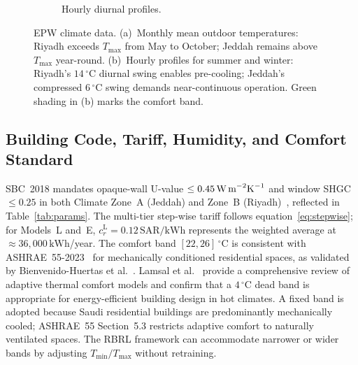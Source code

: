 \documentclass[3p,number]{elsarticle}
\let\oldsubsection\subsection
\renewcommand{\subsection}{\FloatBarrier\oldsubsection}
\newcommand{\Tmin}{T_{\min}}
\newcommand{\Tmax}{T_{\max}}
\newcommand{\SAR}{\text{SAR}}
\newcommand{\kWh}{\text{kWh}}
\begin{document}
\begin{figure}[!t]
\begin{subfigure}[b]{\columnwidth}
\caption{Hourly diurnal profiles.}
\end{subfigure}
\caption{EPW climate data. (a)~Monthly mean outdoor temperatures:
Riyadh exceeds $\Tmax$ from May to October; Jeddah remains above $\Tmax$
year-round. (b)~Hourly profiles for summer and winter: Riyadh's
$14\,^\circ$C diurnal swing enables pre-cooling; Jeddah's compressed
$6\,^\circ$C swing demands near-continuous operation. Green shading in
(b) marks the comfort band.}
\label{fig:climate}
\end{figure}
 
\subsection{Building Code, Tariff, Humidity, and Comfort Standard}
\label{subsec:sbc}
 
SBC~2018 mandates opaque-wall U-value $\le0.45\,\text{W\,m}^{-2}\text{K}^{-1}$ and window SHGC $\le0.25$ in both Climate Zone~A (Jeddah) and Zone~B (Riyadh)~\cite{Alayed2021}, reflected in Table~\ref{tab:params}.
The multi-tier step-wise tariff follows equation~\eqref{eq:stepwise}; for Models~L and~E, $c_r^{\mathrm{L}}=0.12\,\SAR/\kWh$ represents the weighted average at $\approx36{,}000\,\kWh$/year.
The comfort band $[22,26]\,^\circ$C is consistent with ASHRAE~55-2023~\cite{ASHRAE55_2023} for mechanically conditioned residential spaces, as validated by Bienvenido-Huertas et al.~\cite{Bienvenido2024}.
Lamsal et al.~\cite{Lamsal2023} provide a comprehensive review of adaptive thermal comfort models and confirm that a $4\,^\circ$C dead band is appropriate for energy-efficient building design in hot climates.
A fixed band is adopted because Saudi residential buildings are predominantly mechanically cooled; ASHRAE~55 Section~5.3 restricts adaptive comfort to naturally ventilated spaces.
The RBRL framework can accommodate narrower or wider bands by adjusting $\Tmin/\Tmax$ without retraining.
 
\end{document}

